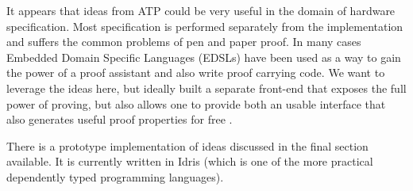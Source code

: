 It appears that ideas from ATP could be very useful in the domain of hardware specification. Most
specification is performed separately from the implementation and suffers the common
problems of pen and paper proof. In many cases Embedded Domain Specific Languages (EDSLs)
have been used as a way to gain the power of a proof assistant and also write proof carrying code\cite{Ricketts:2014}\cite{fesi}. We want
to leverage the ideas here, but ideally built a separate front-end that exposes the full power of proving,
but also allows one to provide both an usable interface that also generates useful proof properties for
free \cite{Ricketts:2014}. \cite{chlipala2011certified} \cite{Pierce:SF}

There is a prototype implementation of ideas discussed in the final section available. It is currently
written in Idris (which is one of the more practical dependently typed programming languages).
